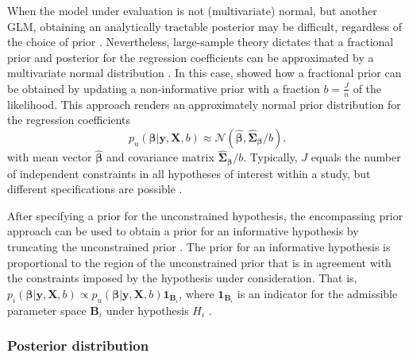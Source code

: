 \documentclass[
]{article}
\begin{document}
When the model under evaluation is not (multivariate) normal, but
another GLM, obtaining an analytically tractable posterior may be
difficult, regardless of the choice of prior \citep{bda2013}.
Nevertheless, large-sample theory dictates that a fractional prior and
posterior for the regression coefficients can be approximated by a
multivariate normal distribution \citep{bda2013}. In this case,
\citet{gu_approximated_2018} showed how a fractional prior can be
obtained by updating a non-informative prior with a fraction
\(b = \frac{J}{n}\) of the likelihood. This approach renders an
approximately normal prior distribution for the regression coefficients
\[
p_u(\boldsymbol{\beta} | \boldsymbol{y}, \boldsymbol{X}, b) \approx 
\mathcal{N}(\boldsymbol{\hat{\beta}}, \boldsymbol{\hat{\Sigma}_\beta} / b).
\] with mean vector \(\boldsymbol{\hat{\beta}}\) and covariance matrix
\(\boldsymbol{\hat{\Sigma}_{\beta}}/b\). Typically, \(J\) equals the
number of independent constraints in all hypotheses of interest within a
study, but different specifications are possible \citep[for an elaborate
discussion on appropriate values for \(J\),
see][]{gu_approximated_2018, hoijtink_prior_2021}.

After specifying a prior for the unconstrained hypothesis, the
encompassing prior approach can be used to obtain a prior for an
informative hypothesis by truncating the unconstrained prior
\citep[e.g.,][]{klugkist_inequality_2005, mulder_equality_2010, mulder_prior_2014}.
The prior for an informative hypothesis is proportional to the region of
the unconstrained prior that is in agreement with the constraints
imposed by the hypothesis under consideration. That is,
\(p_i(\boldsymbol{\beta} | \boldsymbol{y}, \boldsymbol{X}, b) \propto p_u(\boldsymbol{\beta} | \boldsymbol{y}, \boldsymbol{X}, b)\boldsymbol{1}_{\boldsymbol{B}_i}\),
where \(\boldsymbol{1}_{\boldsymbol{B}_i}\) is an indicator for the
admissible parameter space \(\boldsymbol{B}_i\) under hypothesis \(H_i\)
\citep{gu_approximated_2018}.

\hypertarget{posterior-distribution}{%
\subsubsection{Posterior distribution}\label{posterior-distribution}}
\end{document}
